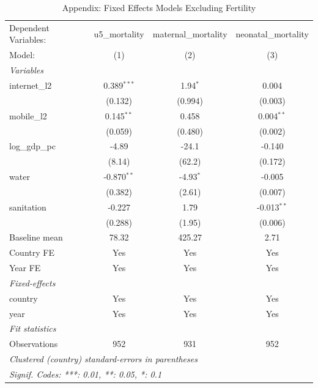 \begin{table}[htbp]
   \caption{\label{tab:appendix_no_fertility} Appendix: Fixed Effects Models Excluding Fertility}
   \centering
   \begin{tabular}{lccc}
      \tabularnewline \midrule \midrule
      Dependent Variables: & u5\_mortality  & maternal\_mortality  & neonatal\_mortality\\   
      Model:               & (1)            & (2)                  & (3)\\  
      \midrule
      \emph{Variables}\\
      internet\_l2         & 0.389$^{***}$  & 1.94$^{*}$           & 0.004\\   
                           & (0.132)        & (0.994)              & (0.003)\\   
      mobile\_l2           & 0.145$^{**}$   & 0.458                & 0.004$^{**}$\\   
                           & (0.059)        & (0.480)              & (0.002)\\   
      log\_gdp\_pc         & -4.89          & -24.1                & -0.140\\   
                           & (8.14)         & (62.2)               & (0.172)\\   
      water                & -0.870$^{**}$  & -4.93$^{*}$          & -0.005\\   
                           & (0.382)        & (2.61)               & (0.007)\\   
      sanitation           & -0.227         & 1.79                 & -0.013$^{**}$\\   
                           & (0.288)        & (1.95)               & (0.006)\\   
      Baseline mean        & 78.32          & 425.27               & 2.71\\  
      Country FE           & Yes            & Yes                  & Yes\\  
      Year FE              & Yes            & Yes                  & Yes\\  
      \midrule
      \emph{Fixed-effects}\\
      country              & Yes            & Yes                  & Yes\\  
      year                 & Yes            & Yes                  & Yes\\  
      \midrule
      \emph{Fit statistics}\\
      Observations         & 952            & 931                  & 952\\  
      \midrule \midrule
      \multicolumn{4}{l}{\emph{Clustered (country) standard-errors in parentheses}}\\
      \multicolumn{4}{l}{\emph{Signif. Codes: ***: 0.01, **: 0.05, *: 0.1}}\\
   \end{tabular}
\end{table}
